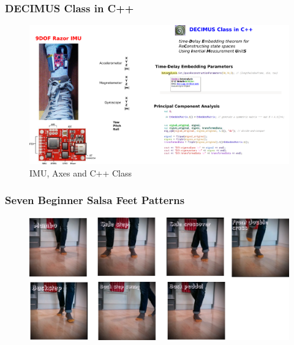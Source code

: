 \documentclass{beamer}
\begin{document}
\begin{frame}
\frametitle{DECIMUS Class in C++}

\begin{figure}
\includegraphics[scale=0.2]{procedure} \\
IMU, Axes and C++ Class
\end{figure}  
\end{frame}





\begin{frame}
\frametitle{Seven Beginner Salsa Feet Patterns}
\vspace{-0.6cm}
\begin{figure}
\includegraphics[scale=0.5]{beginner_salsa_steps_00} \\

\end{figure}  
\end{frame}
\end{document}
